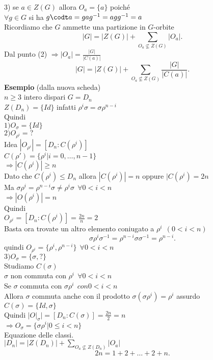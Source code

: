 \documentclass[12px]{article}
\begin{document}
{\begin{dimo}
		3) se $a\in Z(G)$ allora  $O_a = \{a\}$ poiché\\
		$\forall g\in G$ si ha $g\codt a  = gag^{-1} = agg^{-1} = a$\\
		Ricordiamo che  $G$ ammette una partizione in $G$-orbite
		\[
		|G| = |Z(G)| + \sum_{O_a\not\subseteq Z(G)} |O_a|
		.\] 
		Dal punto (2) $ \Rightarrow  |O_a| = \frac{|G|}{|C(a)|}$ 
		\[
			|G| = |Z(G)| + \sum_{O_a\not\subseteq Z(G)}\frac{|G|}{|C(a)|}
		.\] 
		\textbf{Esempio} (dalla nuova scheda)\\
		$n\geq 3$ intero dispari  $G = D_n$\\
		$Z(D_n) = \{Id\}$ infatti  $\rho^i\sigma = \sigma \rho^{n-i}$\\
		Quindi\\
		$1) O_\sigma = \{Id\}$\\
		$2) O_{\rho^i} = ?$ \\
		Idea $|O_{\rho^i}| = [D_n : C(\rho^i)]$ \\
		$C(\rho') = \{\rho^i | i = 0,\ldots,n-1\}$ \\
		$ \Rightarrow |C(\rho^i)| \geq n$ \\
		Dato che $C(\rho^i)\leq D_n$ allora  $|C(\rho^i)| = n$ oppure  $|C(\rho^i) = 2n$\\
		Ma  $\sigma\rho^i = \rho^{n-i}\sigma\neq\rho^i\sigma \ \ \forall 0<i<n$\\
		 $ \Rightarrow |O(\rho^i)| = n$ \\
		 Quindi \\
		 $O_{\rho^i} = [D_n:C(\rho^i)] = \frac{2n}n = 2$ \\
		 Basta ora trovate un altro elemento coniugato a $\rho^i \ \ (0<i<n)$
		  \[
			  \sigma\rho^i\sigma^{-1} = \rho^{n-i}\sigma\sigma^{-1} = \rho^{n-i}
		 .\] 
		 quindi $O_{\rho^i} = \{\rho^i, \rho^{n-i}\} \ \ \forall 0< i< n$\\
		 $3) O_\sigma = \{\sigma, ?\}$\\
		 Studiamo $C(\sigma)$\\
		  $\sigma$ non commuta con $\rho^i \ \ \forall 0 < i  <n$\\
		  Se $\sigma$ commuta con $\sigma\rho^i \ \ con 0<i<n$\\
		  Allora  $\sigma$ commuta anche con il prodotto $\sigma(\sigma\rho^i) = \rho^i$ assurdo \lightning \\
		  $C(\sigma) = \{Id, \sigma\}$\\
		  Quindi  $|O|_\sigma| = [D_n:C(\sigma)] = \frac{2n}2 = n$\\
		  $ \Rightarrow O_\sigma = \{\sigma\rho^i | 0\leq i < n\}$\\
		  Equazione delle classi.\\
		  $|D_n| = |Z(D_n)| + \sum_{O_a\not\subseteq Z(D_n)}|O_a|$\\
		   \[
		  2n = 1 + 2 + \ldots + 2 + n
		  .\] 




\end{dimo}}
\end{document}
